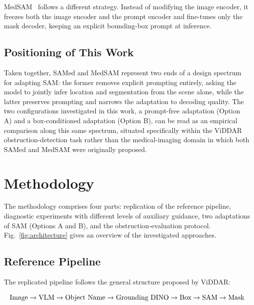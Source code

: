 \documentclass[conference]{IEEEtran}
\begin{document}
MedSAM~\cite{medsam} follows a different strategy. Instead of modifying the image encoder, it freezes both the image encoder and the prompt encoder and fine-tunes only the mask decoder, keeping an explicit bounding-box prompt at inference.

\subsection{Positioning of This Work}

Taken together, SAMed and MedSAM represent two ends of a design spectrum for adapting SAM: the former removes explicit prompting entirely, asking the model to jointly infer location and segmentation from the scene alone, while the latter preserves prompting and narrows the adaptation to decoding quality. The two configurations investigated in this work, a prompt-free adaptation (Option A) and a box-conditioned adaptation (Option B), can be read as an empirical comparison along this same spectrum, situated specifically within the ViDDAR obstruction-detection task rather than the medical-imaging domain in which both SAMed and MedSAM were originally proposed.




\section{Methodology}

The methodology comprises four parts: replication of the reference pipeline, diagnostic experiments with different levels of auxiliary guidance, two adaptations of SAM (Options A and B), and the obstruction-evaluation protocol. Fig.~\ref{fig:architecture} gives an overview of the investigated approaches.

\subsection{Reference Pipeline}\label{sec:ref}

The replicated pipeline follows the general structure proposed by ViDDAR:

\begin{equation*}
\resizebox{\columnwidth}{!}{$
\text{Image} \rightarrow \text{VLM} \rightarrow
\text{Object Name} \rightarrow \text{Grounding DINO} \rightarrow
\text{Box} \rightarrow \text{SAM} \rightarrow \text{Mask}
$}
\end{equation*}
\end{document}
